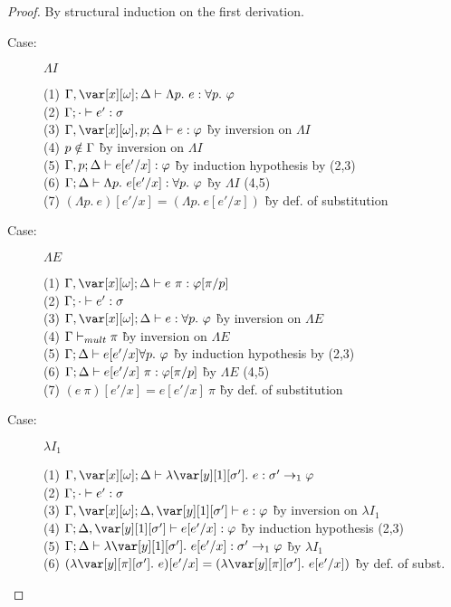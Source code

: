 

\UnrestrictedSubstitutionLemma

\begin{proof}
By structural induction on the first derivation.

\begin{description}

\item[Case:] $\Lambda I$
\begin{tabbing}
  (1) $\G, \xo; \D \vdash \Lambda p.~e : \forall p.~\varphi$\\
  (2) $\Gamma; \cdot \vdash e' : \sigma$ \\
  (3) $\G, \xo, p; \D \vdash e : \varphi$ \` by inversion on $\Lambda I$\\
  (4) $p \notin \Gamma$ \` by inversion on $\Lambda I$\\
  (5) $\Gamma, p; \Delta \vdash e[e'/x] : \varphi$ \` by induction hypothesis by (2,3)\\
  (6) $\Gamma; \Delta \vdash \Lambda p.~e[e'/x] : \forall p.~\varphi$ \` by $\Lambda I$ (4,5)\\
  (7) $(\Lambda p.~e)[e'/x] = (\Lambda p.~e[e'/x])$ \` by def. of substitution\\
\end{tabbing}

\item[Case:] $\Lambda E$
\begin{tabbing}
  (1) $\G, \xo; \D \vdash e~\pi: \varphi[\pi/p]$\\
  (2) $\Gamma; \cdot \vdash e' : \sigma$\\
  (3) $\G, \xo; \D \vdash e : \forall p.~\varphi$ \` by inversion on $\Lambda E$\\
  (4) $\Gamma \vdash_{mult} \pi$ \` by inversion on $\Lambda E$\\
  (5) $\Gamma; \Delta \vdash e[e'/x] \forall p.~\varphi$ \` by induction hypothesis by (2,3)\\
  (6) $\Gamma; \Delta \vdash e[e'/x]~\pi : \varphi[\pi/p]$ \` by $\Lambda E$ (4,5)\\
  (7) $(e~\pi)[e'/x] = e[e'/x]~\pi$ \` by def. of substitution\\
\end{tabbing}

\item[Case:] $\lambda I_1$
\begin{tabbing}
  (1) $\G, \xo; \D \vdash \lambda\y[1][\s'].~e : \s'\to_1\vp$\\
  (2) $\Gamma; \cdot \vdash e' : \sigma$\\
  (3) $\G, \xo; \D, \y[1][\s'] \vdash e : \vp$ \` by inversion on $\lambda I_1$\\
  (4) $\G; \D, \y[1][\s'] \vdash e[e'/x] : \vp$ \` by induction hypothesis (2,3)\\
  (5) $\G; \D \vdash \lambda\y[1][\s'].~e[e'/x] : \s' \to_1\vp$ \` by $\lambda I_1$\\
  (6) $(\lambda \y[\pi][\s'].~e)[e'/x] = (\lambda \y[\pi][\s'].~e[e'/x])$ \` by def. of subst.\\
\end{tabbing}


\end{description}
\end{proof}

